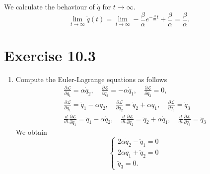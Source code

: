\documentclass[a4paper]{article}
\theoremstyle{plain}
\begin{document}
\begin{enumerate}[label=(\alph*)]
	We calculate the behaviour of $\dot q$ for $t \to \infty$.
	\[
		\lim_{t \to \infty} \dot q(t) = \lim_{t \to \infty} -\frac{\beta}{\alpha}e^{-\frac{\alpha}{m}t} + \frac{\beta}{\alpha} = \frac{\beta}{\alpha}.
	\]
\end{enumerate}

\section*{Exercise 10.3}
\begin{enumerate}[label=(\alph*)]
	\item Compute the Euler-Lagrange equations as follows
	\begin{gather*}
		\frac{\partial \mathcal L}{\partial q_1} = \alpha \dot q_2, \quad \frac{\partial \mathcal L}{\partial q_2} =- \alpha \dot q_1, \quad \frac{\partial \mathcal L}{\partial q_3} = 0, \\
		\frac{\partial \mathcal L}{\partial \dot q_1} = \dot q_1 - \alpha q_2, \quad \frac{\partial \mathcal L}{\partial \dot q_2} = \dot q_2 + \alpha q_1, \quad \frac{\partial \mathcal L}{\partial \dot q_3} = \dot q_3 \\
		\frac{d}{dt}\frac{\partial \mathcal L}{\partial \dot q_1} = \ddot q_1 - \alpha \dot q_2, \quad 	\frac{d}{dt}\frac{\partial \mathcal L}{\partial \dot q_2} = \ddot q_2 + \alpha \dot q_1, \quad 	\frac{d}{dt}\frac{\partial \mathcal L}{\partial \dot q_3} = \ddot q_3
	\end{gather*}
	We obtain
	\[
		\begin{cases}
			2\alpha \dot q_2 - \ddot q_1 = 0 \\
			2 \alpha \dot q_1 + \ddot q_2 = 0 \\
			\ddot q_3 = 0.
		\end{cases}
	\]
	

\end{enumerate}
\end{document}

